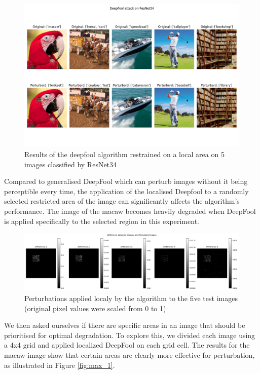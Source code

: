 \documentclass{article}
\begin{document}
\begin{figure}[H]
    \centering
    \includegraphics[width=1\linewidth]{results/vs_50-80.png}
    \caption{Results of the deepfool algorithm restrained on a local area on 5 images classified by ResNet34}
    \label{fig:vs_50-80}
\end{figure}

Compared to generalised DeepFool which can perturb images without it being perceptible every time, the application of the localised Deepfool to a randomly selected restricted area of the image can significantly affects the algorithm's performance. The image of the macaw becomes heavily degraded when DeepFool is applied specifically to the selected region in this experiment.

\begin{figure}[H]
    \centering
    \includegraphics[width=1\linewidth]{results/Diff_local_grey.png}
    \caption{Perturbations applied localy by the algorithm to the five test images (original pixel values were scaled from 0 to 1)}
    \label{fig:diff_local_grey}
\end{figure}


We then asked ourselves if there are specific areas in an image that should be prioritised for optimal degradation. To explore this, we divided each image using a 4x4 grid and applied localized DeepFool on each grid cell. The results for the macaw image show that certain areas are clearly more effective for perturbation, as illustrated in Figure \ref{fig:max_1}. 
\end{document}
